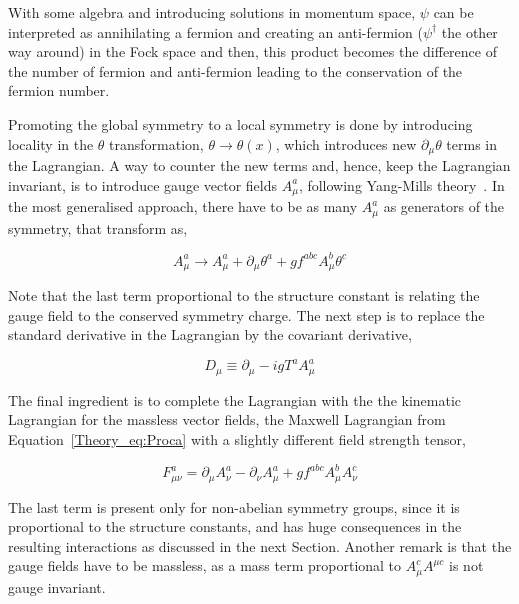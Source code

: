 With some algebra and introducing solutions in momentum space, $\psi$ can be interpreted as annihilating a fermion and creating
an anti-fermion ($\psi^\dag$ the other way around) in the Fock space and then, this product becomes the difference
of the number of fermion and anti-fermion leading to the conservation of the fermion number.

Promoting the global symmetry to a local symmetry is done by introducing locality in the $\theta$ transformation,
$\theta \rightarrow\theta(x)$, which introduces new $\partial_\mu\theta$ terms in the Lagrangian.
A way to counter the new terms and, hence, keep the Lagrangian invariant, is to introduce gauge vector fields $A_\mu^a$,
following Yang-Mills theory~\cite{YangMills}. In the most generalised approach, there have to be as many $A_\mu^a$
as generators of the symmetry, that transform as,

\begin{equation}
    A_\mu^a \rightarrow A_\mu^a + \partial_\mu\theta^a + gf^{abc}A_\mu^b\theta^c
\end{equation}

Note that the last term proportional to the structure constant is relating the gauge field to the conserved symmetry charge.
The next step is to replace the standard derivative in the Lagrangian by the covariant derivative,

\begin{equation}
    D_\mu\equiv\partial_\mu - igT^aA_\mu^a
\end{equation}

The final ingredient is to complete the Lagrangian with the the kinematic Lagrangian for the massless vector fields,
the Maxwell Lagrangian from Equation~\ref{Theory_eq:Proca} with a slightly different field strength tensor,

\begin{equation}
    F_{\mu\nu}^a=\partial_\mu A_\nu^a - \partial_\nu A_\mu^a + gf^{abc}A_\mu^bA_\nu^c
\end{equation}

The last term is present only for non-abelian symmetry groups, since it is proportional to the structure constants,
and has huge consequences in the resulting interactions as discussed in the next Section.
Another remark is that the gauge fields have to be massless, as a mass term proportional to $A_\mu^cA^{\mu c}$ is not gauge invariant.

